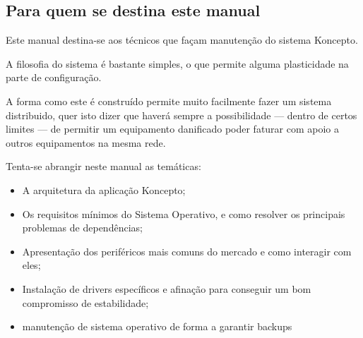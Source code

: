 \documentclass[a4paper,11pt,openany]{memoir}
\begin{document}
\vspace*{\fill}

\cleardoublepage

\pagestyle{headings}




\tableofcontents


\mainmatter


%

\subsection{Para quem se destina este manual}

Este manual destina-se aos técnicos que façam manutenção do sistema Koncepto. 

A filosofia do sistema é bastante simples, o que permite alguma plasticidade na parte de configuração. 

A forma como este é construído permite muito facilmente fazer um sistema distribuido, quer isto dizer que haverá sempre 
a possibilidade --- dentro de certos limites --- de permitir um equipamento danificado poder faturar com apoio a outros equipamentos na mesma rede.

Tenta-se abrangir neste manual as temáticas:
\begin{itemize}
\item A arquitetura da aplicação Koncepto;
\item Os requisitos mínimos do Sistema Operativo, e como resolver os principais problemas de dependências;
\item Apresentação dos periféricos mais comuns do mercado e como interagir com eles;
\item Instalação de drivers específicos e afinação para conseguir um bom compromisso de estabilidade;
\item manutenção de sistema operativo de forma a garantir backups 
\end{itemize}
\end{document}
